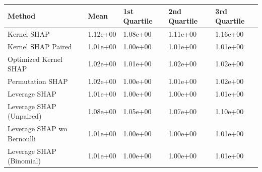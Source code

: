 \begin{tabular}{lllll}
  \toprule
  \textbf{Method} & \textbf{Mean} & \textbf{1st Quartile} & \textbf{2nd Quartile} & \textbf{3rd Quartile} \\ \midrule
Kernel SHAP & 1.12e+00 & 1.08e+00 & 1.11e+00 & 1.16e+00\\
Kernel SHAP Paired & \cellcolor{gold!60}1.01e+00 & \cellcolor{gold!60}1.00e+00 & 1.01e+00 & \cellcolor{gold!60}1.01e+00\\
Optimized Kernel SHAP & 1.02e+00 & 1.01e+00 & 1.02e+00 & 1.02e+00\\
Permutation SHAP & 1.02e+00 & \cellcolor{gold!60}1.00e+00 & 1.01e+00 & 1.02e+00\\
Leverage SHAP & \cellcolor{gold!60}1.01e+00 & \cellcolor{gold!60}1.00e+00 & \cellcolor{gold!60}1.00e+00 & \cellcolor{gold!60}1.01e+00\\
Leverage SHAP (Unpaired) & 1.08e+00 & 1.05e+00 & 1.07e+00 & 1.10e+00\\
Leverage SHAP wo Bernoulli & \cellcolor{gold!60}1.01e+00 & \cellcolor{gold!60}1.00e+00 & \cellcolor{gold!60}1.00e+00 & \cellcolor{gold!60}1.01e+00\\
Leverage SHAP (Binomial) & \cellcolor{gold!60}1.01e+00 & \cellcolor{gold!60}1.00e+00 & \cellcolor{gold!60}1.00e+00 & \cellcolor{gold!60}1.01e+00\\
\bottomrule
\end{tabular}
